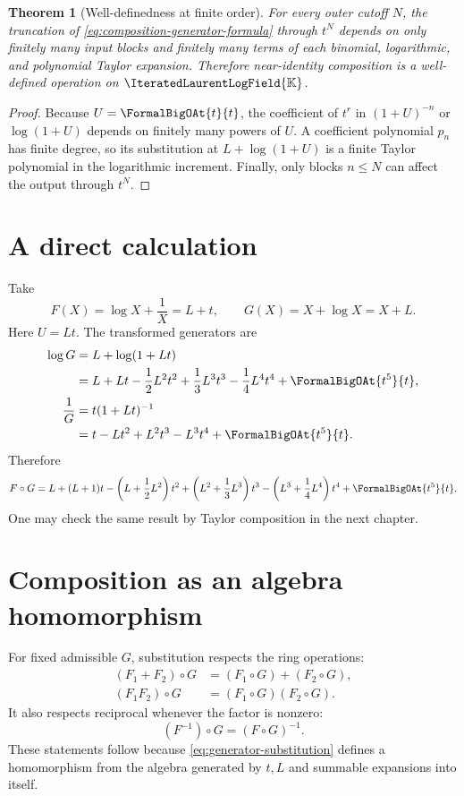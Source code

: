 \documentclass[11pt,oneside]{book}
\newtheorem{theorem}{Theorem}[chapter]
\theoremstyle{definition}
\theoremstyle{remark}
\newcommand{\K}{\mathbb K}
\newcommand{\PLfield}{\IteratedLaurentLogField{\K}}
\newcommand{\compose}{\mathbin{\circ}}
\begin{document}
\begin{theorem}[Well-definedness at finite order]\label{thm:composition-well-defined}
For every outer cutoff $N$, the truncation of \eqref{eq:composition-generator-formula}
through $t^N$ depends on only finitely many input blocks and finitely many
terms of each binomial, logarithmic, and polynomial Taylor expansion.
Therefore near-identity composition is a well-defined operation on
$\PLfield$.
\end{theorem}
\begin{proof}
Because $U=\FormalBigOAt{t}{t}$, the coefficient of $t^r$ in $(1+U)^{-n}$ or
$\log(1+U)$ depends on finitely many powers of $U$.  A coefficient polynomial
$p_n$ has finite degree, so its substitution at
$L+\log(1+U)$ is a finite Taylor polynomial in the logarithmic increment.
Finally, only blocks $n\le N$ can affect the output through $t^N$.
\end{proof}

\section{A direct calculation}
Take
\[
 F(X)=\log X+\frac1X=L+t,
 \qquad
 G(X)=X+\log X=X+L.
\]
Here $U=Lt$.  The transformed generators are
\begin{align*}
 \log G
 &=L+\log(1+Lt)\\
 &=L+Lt-\frac12L^2t^2+\frac13L^3t^3
   -\frac14L^4t^4+\FormalBigOAt{t^5}{t},\\
 \frac1G
 &=t(1+Lt)^{-1}\\
 &=t-Lt^2+L^2t^3-L^3t^4+\FormalBigOAt{t^5}{t}.
\end{align*}
Therefore
\begin{equation}\label{eq:composition-example}
 F\compose G
 =L+(L+1)t-\left(L+\frac12L^2\right)t^2
 +\left(L^2+\frac13L^3\right)t^3
 -\left(L^3+\frac14L^4\right)t^4
 +\FormalBigOAt{t^5}{t}.
\end{equation}
One may check the same result by Taylor composition in the next chapter.

\section{Composition as an algebra homomorphism}
For fixed admissible $G$, substitution respects the ring operations:
\begin{align}\label{eq:composition-homomorphism}
 (F_1+F_2)\compose G&=(F_1\compose G)+(F_2\compose G),\\
 (F_1F_2)\compose G&=(F_1\compose G)(F_2\compose G).
\end{align}
It also respects reciprocal whenever the factor is nonzero:
\[
 (F^{-1})\compose G=(F\compose G)^{-1}.
\]
These statements follow because \eqref{eq:generator-substitution} defines a
homomorphism from the algebra generated by $t,L$ and summable expansions into
itself.
\end{document}
